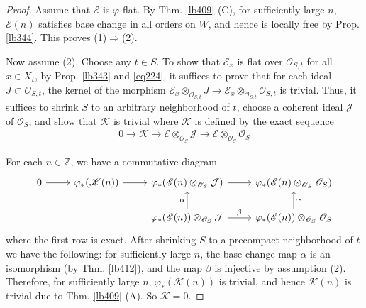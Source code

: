 \documentclass[12pt,b5paper,notitlepage]{report}
\theoremstyle{definition}
\theoremstyle{plain}
\newcommand{\mc}{\mathcal}
\newcommand{\scr}{\mathscr}
\newcommand{\Zbb}{\mathbb Z}
\numberwithin{equation}{section}
\begin{document}
\begin{proof}
Assume that $\scr E$ is $\varphi$-flat. By Thm. \ref{lb409}-(C), for sufficiently large $n$, $\scr E(n)$ satisfies base change in all orders on $W$, and hence is locally free by Prop. \ref{lb344}. This proves (1)$\Rightarrow$(2).

Now assume (2). Choose any $t\in S$. To show that $\scr E_x$ is flat over $\scr O_{S,t}$ for all $x\in X_t$, by Prop. \ref{lb343} and \eqref{eq224}, it suffices to prove that for each ideal $J\subset\scr O_{S,t}$, the kernel of the morphism $\scr E_x\otimes_{\scr O_{S,t}} J\rightarrow\scr E_x\otimes_{\scr O_{S,t}}\scr O_{S,t}$ is trivial. Thus, it suffices to shrink $S$ to an arbitrary neighborhood of $t$, choose a coherent ideal $\mc J$ of $\scr O_S$, and show that $\scr K$ is trivial where $\scr K$ is defined by the exact sequence
\begin{align*}
0\rightarrow\scr K\rightarrow \scr E\otimes_{\scr O_S}\mc J\rightarrow\scr E\otimes_{\scr O_S}\scr O_S
\end{align*} 

For each $n\in\Zbb$, we have a commutative diagram
\begin{equation*}
\begin{tikzcd}
0 \arrow[r] & \varphi_*(\scr K(n)) \arrow[r] & \varphi_*(\scr E(n)\otimes_{\scr O_S}\mc J) \arrow[r]           & \varphi_*(\scr E(n)\otimes_{\scr O_S}\scr O_S)           \\
            &             & \varphi_*(\scr E(n))\otimes_{\scr O_S}\mc J \arrow[r, "\beta"] \arrow[u,"\alpha"] & \varphi_*(\scr E(n))\otimes_{\scr O_S}\scr O_S \arrow[u,"\simeq"']
\end{tikzcd}
\end{equation*}
where the first row is exact. After shrinking $S$ to a precompact neighborhood of $t$ we have the following: for sufficiently large $n$, the base change map $\alpha$ is an isomorphism (by Thm. \ref{lb412}), and the map $\beta$ is injective by assumption (2). Therefore, for sufficiently large $n$, $\varphi_*(\scr K(n))$ is trivial, and hence $\scr K(n)$ is trivial due to Thm. \ref{lb409}-(A). So $\scr K=0$.
\end{proof}















\newpage
\end{document}
